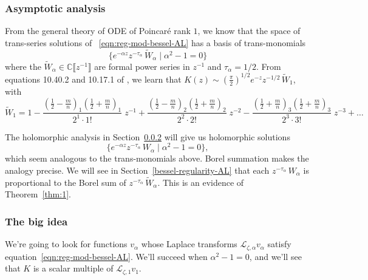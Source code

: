 \documentclass{article}
\theoremstyle{definition}
\newcommand{\C}{\mathbb{C}}
\newcommand{\series}[1]{\tilde{#1}}
\newcommand{\laplace}{\mathcal{L}}
\begin{document}
\subsubsection{Asymptotic analysis}

From the general theory of ODE of Poincar\'e rank $1$, we know that the space of trans-series solutions of ~\eqref{eqn:reg-mod-bessel-AL} has a basis of trans-monomials
\[ \{ e^{-\alpha z} z^{-\tau_\alpha}\,\series{W}_\alpha \mid \alpha^2 - 1 = 0 \} \]
where the $\series{W}_\alpha\in\C\llbracket z^{-1} \rrbracket$ are formal power series in $z^{-1}$ and $\tau_\alpha=1/2$. From equations 10.40.2 and 10.17.1 of \cite{dlmf}, we learn that $K(z) \sim \left(\tfrac{\pi}{2}\right)^{1/2} e^{-z} z^{-1/2}\,\series{W}_1$, with
\begin{equation}\label{bessel-asymp-AL}
\series{W}_1 = 1 - \frac{(\tfrac{1}{2}-\tfrac{m}{n})_1 (\tfrac{1}{2}+\frac{m}{n})_1}{2^1 \cdot 1!}\;z^{-1} + \frac{(\tfrac{1}{2}-\tfrac{m}{n})_2 (\tfrac{1}{2}+\tfrac{m}{n})_2}{2^2 \cdot 2!}\;z^{-2} - \frac{(\tfrac{1}{2}+\tfrac{m}{n})_3 (\tfrac{1}{2}+\tfrac{m}{n})_3}{2^3 \cdot 3!}\;z^{-3} + \ldots
\end{equation}

The holomorphic analysis in Section~\ref{big-idea} will give us holomorphic solutions
\[ \{ e^{-\alpha z} z^{-\tau_\alpha}\,W_\alpha \mid \alpha^2 - 1 = 0 \}, \]
which seem analogous to the trans-monomials above. Borel summation makes the analogy precise. We will see in Section~\ref{bessel-regularity-AL} that each $z^{-\tau_\alpha}\,W_\alpha$ is proportional to the Borel sum of $z^{-\tau_\alpha}\,\series{W}_\alpha$. This is an evidence of Theorem~\ref{thm:1}.
\subsubsection{The big idea}\label{big-idea}
We're going to look for functions $v_\alpha$ whose Laplace transforms $\laplace_{\zeta, \alpha} v_\alpha$ satisfy equation~\eqref{eqn:reg-mod-bessel-AL}. We'll succeed when $\alpha^2 - 1 = 0$, and we'll see that $K$ is a scalar multiple of $\laplace_{\zeta, 1} v_1$.
\end{document}
